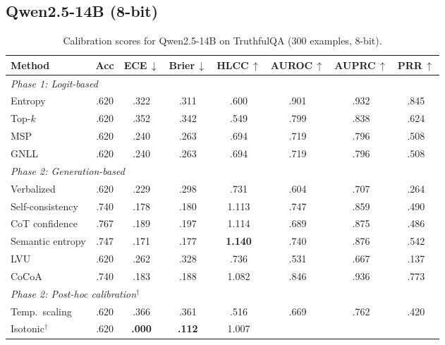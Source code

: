\documentclass[11pt,a4paper]{article}
\begin{document}
\subsection{Qwen2.5-14B (8-bit)}
\label{app:calibration-qwen2.5-14b}

\begin{table}[H]
\centering
\caption{Calibration scores for Qwen2.5-14B on TruthfulQA (300 examples, 8-bit).}
\label{tab:full-calibration-qwen2.5-14b}
\small
\begin{tabular}{@{}lccccccc@{}}
\toprule
Method & Acc & ECE\,$\downarrow$ & Brier\,$\downarrow$ & HLCC\,$\uparrow$
       & AUROC\,$\uparrow$ & AUPRC\,$\uparrow$ & PRR\,$\uparrow$ \\
\midrule
\multicolumn{8}{l}{\emph{Phase 1: Logit-based}} \\
Entropy                  & .620 & .322 & .311 & .600
                 & .901 & .932 & .845 \\
Top-$k$                  & .620 & .352 & .342 & .549
                 & .799 & .838 & .624 \\
MSP                      & .620 & .240 & .263 & .694
                 & .719 & .796 & .508 \\
GNLL                     & .620 & .240 & .263 & .694
                 & .719 & .796 & .508 \\
\midrule
\multicolumn{8}{l}{\emph{Phase 2: Generation-based}} \\
Verbalized               & .620 & .229 & .298 & .731
                 & .604 & .707 & .264 \\
Self-consistency         & .740 & .178 & .180 & 1.113
                 & .747 & .859 & .490 \\
CoT confidence           & .767 & .189 & .197 & 1.114
                 & .689 & .875 & .486 \\
Semantic entropy         & .747 & .171 & .177 & \textbf{1.140}
                 & .740 & .876 & .542 \\
LVU                      & .620 & .262 & .328 & .736
                 & .531 & .667 & .137 \\
CoCoA                    & .740 & .183 & .188 & 1.082
                 & .846 & .936 & .773 \\
\midrule
\multicolumn{8}{l}{\emph{Phase 2: Post-hoc calibration$^\dagger$}} \\
Temp.\ scaling           & .620 & .366 & .361 & .516
                 & .669 & .762 & .420 \\
Isotonic$^\dagger$       & .620 & \textbf{.000} & \textbf{.112} & 1.007

\end{tabular}
\end{table}
\end{document}

